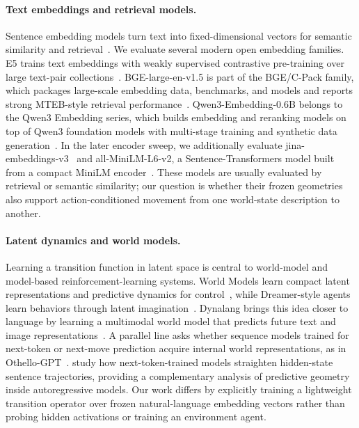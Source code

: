 \documentclass{article}
\begin{document}
\paragraph{Text embeddings and retrieval models.}
Sentence embedding models turn text into fixed-dimensional vectors for semantic similarity and retrieval~\citep{reimers2019sentencebert}. We evaluate several modern open embedding families. E5 trains text embeddings with weakly supervised contrastive pre-training over large text-pair collections~\citep{wang2022e5}. BGE-large-en-v1.5 is part of the BGE/C-Pack family, which packages large-scale embedding data, benchmarks, and models and reports strong MTEB-style retrieval performance~\citep{xiao2024cpack}. Qwen3-Embedding-0.6B belongs to the Qwen3 Embedding series, which builds embedding and reranking models on top of Qwen3 foundation models with multi-stage training and synthetic data generation~\citep{zhang2025qwen3embedding}. In the later encoder sweep, we additionally evaluate jina-embeddings-v3~\citep{sturua2024jinaembeddingsv3} and all-MiniLM-L6-v2, a Sentence-Transformers model built from a compact MiniLM encoder~\citep{huggingfaceAllMiniLML6V2,wang2020minilm}. These models are usually evaluated by retrieval or semantic similarity; our question is whether their frozen geometries also support action-conditioned movement from one world-state description to another.

\paragraph{Latent dynamics and world models.}
Learning a transition function in latent space is central to world-model and model-based reinforcement-learning systems. World Models learn compact latent representations and predictive dynamics for control~\citep{ha2018worldmodels}, while Dreamer-style agents learn behaviors through latent imagination~\citep{hafner2020dreamer}. Dynalang brings this idea closer to language by learning a multimodal world model that predicts future text and image representations~\citep{lin2024dynalang}. A parallel line asks whether sequence models trained for next-token or next-move prediction acquire internal world representations, as in Othello-GPT~\citep{li2023othello}. \citet{hosseini2023straighten} study how next-token-trained models straighten hidden-state sentence trajectories, providing a complementary analysis of predictive geometry inside autoregressive models. Our work differs by explicitly training a lightweight transition operator over frozen natural-language embedding vectors rather than probing hidden activations or training an environment agent.
\end{document}

